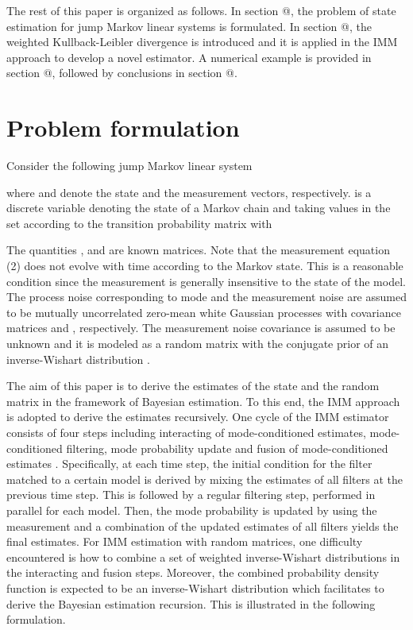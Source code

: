 \documentclass[12pt,draftcls,onecolumn]{IEEEtran}
\makeatletter
\newcommand{\Rmnum}[1]{\expandafter\@slowromancap\romannumeral #1@}
\makeatother
\begin{document}
The rest of this paper is organized as follows. In section
\Rmnum{2}, the problem of state estimation for jump Markov linear
systems is formulated. In section \Rmnum{3}, the weighted
Kullback-Leibler divergence is introduced and it is applied in the
IMM approach to develop a novel estimator. A numerical example is
provided in section \Rmnum{4}, followed by conclusions in section
\Rmnum{5}.

\section{Problem formulation}


Consider the following jump Markov linear system

where  and  denote the state
and the measurement vectors, respectively.  is a discrete
variable denoting the state of a Markov chain and taking values in
the set  according to the
transition probability matrix  with

The quantities ,  and  are known
matrices. Note that the measurement equation (2) does not evolve
with time according to the Markov state. This is a reasonable
condition since the measurement is generally insensitive to the
state of the model. The process noise  corresponding
to mode  and the measurement noise  are assumed to be
mutually uncorrelated zero-mean white Gaussian processes with
covariance matrices  and , respectively. The
measurement noise covariance  is assumed to be unknown and it
is modeled as a random matrix with the conjugate prior of an
inverse-Wishart distribution \cite{1999mvd}.


The aim of this paper is to derive the estimates of the state 
and the random matrix  in the framework of Bayesian estimation.
To this end, the IMM approach is adopted to derive the estimates
recursively. One cycle of the IMM estimator consists of four steps
including interacting of mode-conditioned estimates,
mode-conditioned filtering, mode probability update and fusion of
mode-conditioned estimates \cite{1988imm}. Specifically, at each
time step, the initial condition for the filter matched to a certain
model is derived by mixing the estimates of all filters at the
previous time step. This is followed by a regular filtering step,
performed in parallel for each model. Then, the mode probability is
updated by using the measurement and a combination of the updated
estimates of all filters yields the final estimates. For IMM
estimation with random matrices, one difficulty encountered is how
to combine a set of weighted inverse-Wishart distributions in the
interacting and fusion steps. Moreover, the combined probability
density function is expected to be an inverse-Wishart distribution
which facilitates to derive the Bayesian estimation recursion. This
is illustrated in the following formulation.
\end{document}
